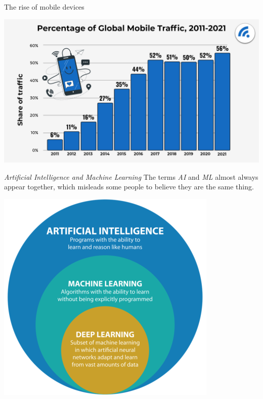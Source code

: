\documentclass[dvipsnames, handout]{beamer}
\newcommand{\1}{\mathds{1}}	%
\begin{document}
\begin{frame}{The rise of mobile devices}
\begin{center}
\includegraphics[scale=0.15]{presentation/mobile_traffic.png}
\end{center}
\pause
\end{frame}

\begin{frame}{\emph{Artificial Intelligence and Machine Learning}}
The terms \emph{AI} and \emph{ML} almost always appear together, which misleads some people to believe they are the same thing.
\begin{center}
\includegraphics[scale=0.5]{presentation/ml_def.png}
\end{center}
\pause
\end{frame}
\end{document}
